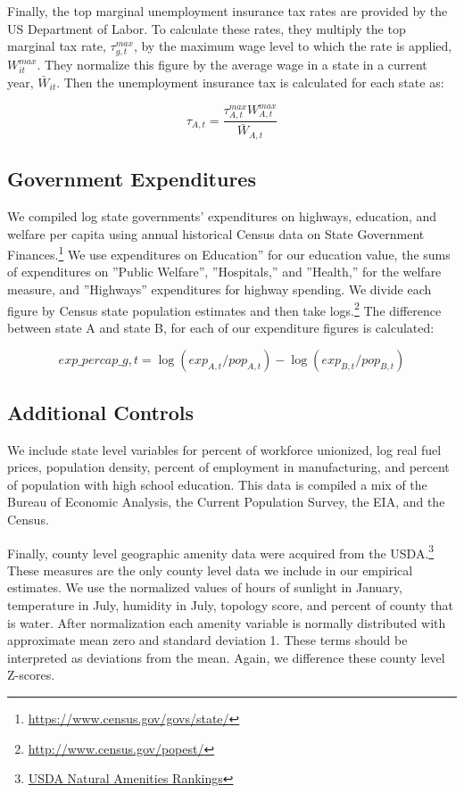 Finally, the top marginal unemployment insurance tax rates are provided by the US Department of Labor. To calculate these rates, they multiply the top marginal tax rate, $\tau_{g,t}^{max}$, by the maximum wage level to which the rate is applied, $W_{it}^{max}$. They normalize this figure by the average wage in a state in a current year, $\bar W_{it}$. Then the unemployment insurance tax is calculated for each state as: 

\begin{equation} \tau_{A,t} = \frac{\tau_{A,t}^{max}W_{A,t}^{max}}{\bar W_{A,t}}\end{equation}

\subsection{Government Expenditures}

We compiled log state governments’ expenditures on highways, education, and welfare per capita using annual historical Census data on State Government Finances.\footnote{\url{https://www.census.gov/govs/state/}} We use expenditures on Education” for our education value, the sums of expenditures on ”Public Welfare”, ”Hospitals,” and ”Health,” for the welfare measure, and ”Highways” expenditures for highway spending.  We divide each figure by Census state population estimates and then take logs.\footnote{\url{http://www.census.gov/popest/}} The difference between state A and state B, for each of our expenditure figures is calculated:

\begin{equation} exp\_percap\_{g,t} = \log(exp_{A,t}/pop_{A,t}) - \log(exp_{B,t}/pop_{B,t}) \end{equation}

\subsection{Additional Controls}

We include state level variables for percent of workforce unionized, log real fuel prices, population density, percent of employment in manufacturing, and percent of population with high school education. This data is compiled a mix of the Bureau of Economic Analysis, the Current Population Survey, the EIA, and the Census.

Finally, county level geographic amenity data were acquired from the USDA.\footnote{\href{http://www.ers.usda.gov/data-products/natural-amenities-scale.aspx}{USDA Natural Amenities Rankings}} These measures are the only county level data we include in our empirical estimates. We use the normalized values of hours of sunlight in January, temperature in July, humidity in July, topology score, and percent of county that is water. After normalization each amenity variable is normally distributed with approximate mean zero and standard deviation 1. These terms should be interpreted  as deviations from the mean. Again, we difference these county level Z-scores.

